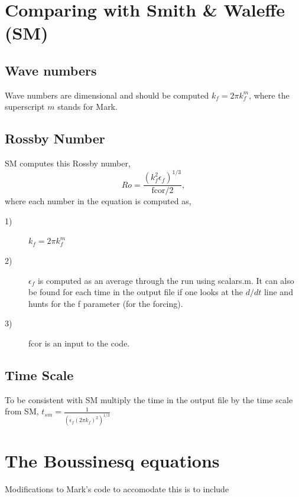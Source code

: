 \documentclass[12pt]{article}
\begin{document}
\section{Comparing with Smith \& Waleffe (SM)}

\subsection*{Wave numbers}
Wave numbers are dimensional and should be computed $k_f = 2 \pi
k_f^m$, where the superscript $m$ stands for Mark. 

\subsection*{Rossby Number}
SM computes this Rossby number,
\begin{equation}
  Ro = \frac{(k_f^2 \epsilon_f)^{1/3}}{\text{fcor}/2},
\end{equation}
where each number in the equation is computed as,
\begin{description}
   \item[1)] $k_f = 2 \pi k_f^m$
   \item[2)] $\epsilon_f$ is computed as an average through the run using
     scalars.m. It can also be found for each time in the output file
     if one looks at the $d/dt$ line and hunts for the f parameter (for
     the forcing).
  \item[3)] fcor is an input to the code.
\end{description}

\subsection*{Time Scale}
To be consistent with SM multiply the time in the output file by the
time scale from SM, $t_{sm} = \frac{1}{(\epsilon_f (2 \pi k_f)^2)^{1/3}}$

\section{The Boussinesq equations} 

Modifications to Mark's code to accomodate this is to include
\end{document}
